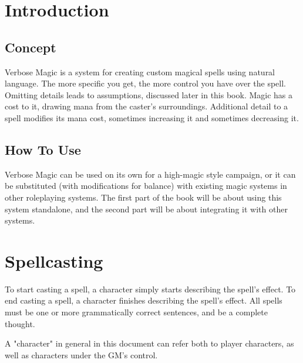 \documentclass[10pt,a4paper,twocolumn,openany]{book}
\begin{document}
\selectfont %
\frontmatter

\rpgMakeCover[
    title = Verbose Magic,
    subtitle = Created by Cassandra de la Cruz-Munoz \\ \today \\ \url{https://github.com/Krozark/RPG-LaTeX-Template}
]


\tableofcontents

\mainmatter

\chapter{Introduction}

\section{Concept}
Verbose Magic is a system for creating custom magical spells using natural language.
The more specific you get, the more control you have over the spell.
Omitting details leads to assumptions, discussed later in this book.
Magic has a cost to it, drawing mana from the caster's surroundings.
Additional detail to a spell modifies its mana cost, sometimes increasing it and sometimes decreasing it.

\section{How To Use}
Verbose Magic can be used on its own for a high-magic style campaign, or it can be substituted (with modifications for balance) with existing magic systems in other roleplaying systems.
The first part of the book will be about using this system standalone, and the second part will be about integrating it with other systems.	

\chapter{Spellcasting}
To start casting a spell, a character simply starts describing the spell's effect.
To end casting a spell, a character finishes describing the spell's effect.
All spells must be one or more grammatically correct sentences, and be a complete thought.

\begin{rpg-commentbox}
	A "character" in general in this document can refer both to player characters, as well as characters under the GM's control.
\end{rpg-commentbox}
\end{document}
